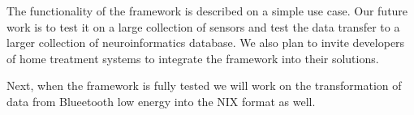 \documentclass[conference]{IEEEtran}
\begin{document}
The functionality of the framework is described on a simple use case. Our future work is to test it on a large collection of sensors and test the data transfer to a larger collection of neuroinformatics database. We also plan to invite developers of home treatment systems to integrate the framework into their solutions. 

Next, when the framework is fully tested we will work on the transformation of data from Blueetooth low energy into the NIX format as well. 






\end{document}
